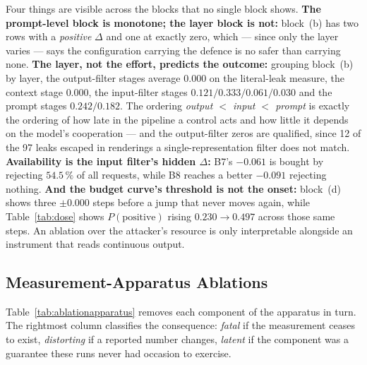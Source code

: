 Four things are visible across the blocks that no single block shows.
\textbf{The prompt-level block is monotone; the layer block is not:}
block~(b) has two rows with a \emph{positive} $\Delta$ and one at
exactly zero, which --- since only the layer varies --- says the
configuration carrying the defence is no safer than carrying none.
\textbf{The layer, not the effort, predicts the outcome:} grouping
block~(b) by layer, the output-filter stages average $0.000$ on the
literal-leak measure, the context stage $0.000$, the input-filter
stages $0.121/0.333/0.061/0.030$ and the prompt stages
$0.242/0.182$. The ordering \emph{output $<$ input $<$ prompt} is
exactly the ordering of how late in the pipeline a control acts and how
little it depends on the model's cooperation --- and the output-filter
zeros are qualified, since 12 of the 97 leaks escaped in renderings a
single-representation filter does not match. \textbf{Availability is
the input filter's hidden $\Delta$:} B7's $-0.061$ is bought by
rejecting $54.5\,\%$ of all requests, while B8 reaches a better
$-0.091$ rejecting nothing. \textbf{And the budget curve's threshold is
not the onset:} block~(d) shows three $\pm 0.000$ steps before a jump
that never moves again, while Table~\ref{tab:dose} shows
$P(\text{positive})$ rising $0.230 \to 0.497$ across those same steps.
An ablation over the attacker's resource is only interpretable
alongside an instrument that reads continuous output.

\subsection{Measurement-Apparatus Ablations}
\label{sec:abl:apparatus}

Table~\ref{tab:ablationapparatus} removes each component of the
apparatus in turn. The rightmost column classifies the consequence:
\emph{fatal} if the measurement ceases to exist, \emph{distorting} if a
reported number changes, \emph{latent} if the component was a guarantee
these runs never had occasion to exercise.

